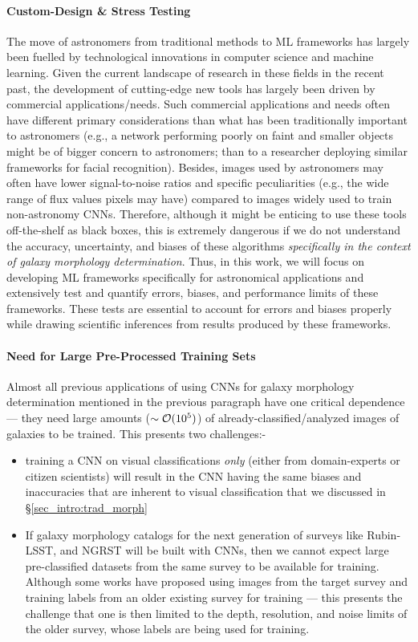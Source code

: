 \paragraph{Custom-Design \& Stress Testing} The move of astronomers from traditional methods to ML frameworks has largely been fuelled by technological innovations in computer science and machine learning. Given the current landscape of research in these fields in the recent past, the development of cutting-edge new tools has largely been driven by commercial applications/needs. Such commercial applications and needs often have different primary considerations than what has been traditionally important to astronomers (e.g., a network performing poorly on faint and smaller objects might be of bigger concern to astronomers; than to a researcher deploying similar frameworks for facial recognition). Besides, images used by astronomers may often have lower signal-to-noise ratios and specific peculiarities (e.g., the wide range of flux values pixels may have) compared to images widely used to train non-astronomy CNNs. Therefore, although it might be enticing to use these tools off-the-shelf as black boxes, this is extremely dangerous if we do not understand the accuracy, uncertainty, and biases of these algorithms \textit{specifically in the context of galaxy morphology determination}. Thus, in this work, we will focus on developing ML frameworks specifically for astronomical applications and extensively test and quantify errors, biases, and performance limits of these frameworks. These tests are essential to account for errors and biases properly while drawing scientific inferences from results produced by these frameworks. 

\paragraph{Need for Large Pre-Processed Training Sets} Almost all previous applications of using CNNs for galaxy morphology determination mentioned in the previous paragraph have one critical dependence --- they need large amounts ($\sim \mathcal{O}(10^{5})$) of already-classified/analyzed images of galaxies to be trained. This presents two challenges:- 

\begin{itemize}
    \item training a CNN on visual classifications \textit{only} (either from domain-experts or citizen scientists) will result in the CNN having the same biases and inaccuracies that are inherent to visual classification that we discussed in \S \ref{sec_intro:trad_morph}
    \item If galaxy morphology catalogs for the next generation of surveys like Rubin-LSST, and NGRST will be built with CNNs, then we cannot expect large pre-classified datasets from the same survey to be available  for training. Although some works \citep[e.g.,][]{Cheng2021GalaxyNetworks} have proposed using images from the target survey and training labels from an older existing survey for training --- this presents the challenge that one is then limited to the depth, resolution, and noise limits of the older survey, whose labels are being used for training. 
\end{itemize}

